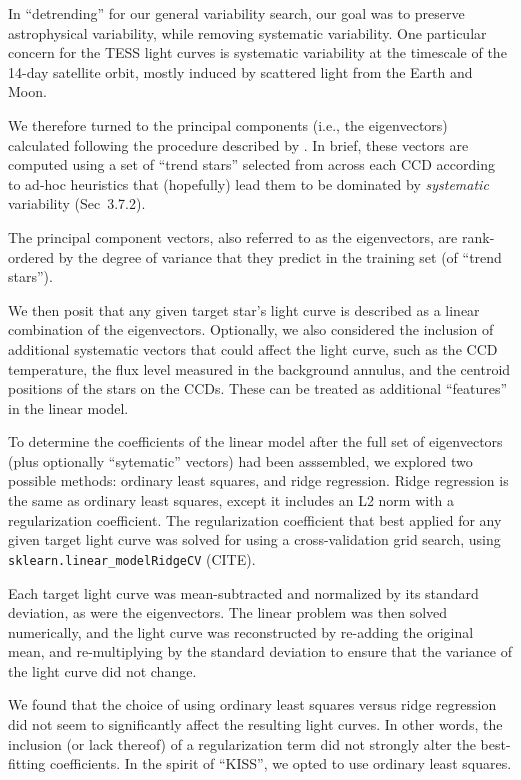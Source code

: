 \documentclass[12pt,twocolumn,tighten]{aastex63}
\begin{document}
In ``detrending'' for our general variability search, our goal was to
preserve astrophysical variability, while removing systematic
variability.  One particular concern for the TESS light curves is
systematic variability at the timescale of the 14-day satellite orbit,
mostly induced by scattered light from the Earth and Moon.

We therefore turned to the principal components (i.e., the
eigenvectors) calculated following the procedure described by
\citet{bouma_cdipsI_2019}. In brief, these vectors are computed using
a set of ``trend stars'' selected from across each CCD according to
ad-hoc heuristics that (hopefully) lead them to be dominated by {\it
systematic} variability (Sec~3.7.2).

The principal component vectors, also referred to as the eigenvectors,
are rank-ordered by the degree of variance that they predict in the
training set (of ``trend stars'').

We then posit that any given target star's light curve is described as
a linear combination of the eigenvectors.  Optionally, we also
considered the inclusion of additional systematic vectors that could
affect the light curve, such as the CCD temperature, the flux level
measured in the background annulus, and the centroid positions of the
stars on the CCDs.  These can be treated as additional ``features'' in
the linear model.

To determine the coefficients of the linear
model after the full set of eigenvectors (plus optionally
``sytematic'' vectors) had been asssembled,  we explored two possible
methods: ordinary
least squares, and ridge regression. Ridge regression is the same as
ordinary least squares, except it includes an L2 norm with a regularization
coefficient. The regularization coefficient that best applied for any
given target light curve was solved for using a cross-validation grid
search, using \texttt{sklearn.linear\_modelRidgeCV} (CITE). 

Each target light curve was mean-subtracted and normalized by its
standard deviation, as were the eigenvectors. The linear problem was
then solved numerically, and the light curve was reconstructed by re-adding the
original mean, and re-multiplying by the standard deviation to ensure
that the variance of the light curve did not change.

We found that the choice of using ordinary
least squares versus ridge regression did not seem to significantly
affect the resulting light curves. In other words, the inclusion (or
lack thereof) of a regularization term did not strongly alter the
best-fitting coefficients.
In the spirit of ``KISS'', we opted to use ordinary least squares.
\end{document}

